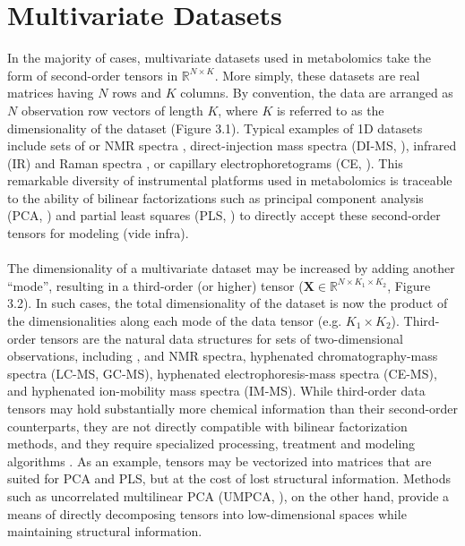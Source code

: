 \section{Multivariate Datasets}

\begin{doublespace}
In the majority of cases, multivariate datasets used in metabolomics take the
form of second-order tensors in $\mathbb{R}^{N \times K}$. More simply, these
datasets are real matrices having $N$ rows and $K$ columns. By convention,
the data are arranged as $N$ observation row vectors of length $K$, where $K$
is referred to as the dimensionality of the dataset (Figure 3.1). Typical
examples of 1D datasets include sets of \hnmr{} or \cnmr{} NMR spectra
\cite{beckonert:nprot2007,koh:colon2009}, direct-injection mass spectra
(DI-MS, \cite{castrillo:phch2003,southam:anchem2007,zhou:asms2010}), infrared
(IR) and Raman spectra \cite{ellis:analyst2006,cherney:anchem2007}, or
capillary electrophoretograms (CE, \cite{ramautar:trac2006}). This remarkable
diversity of instrumental platforms used in metabolomics is traceable to the
ability of bilinear factorizations such as principal component analysis
(PCA, \cite{jolliffe2002}) and partial least squares (PLS, \cite{wold1993}) to
directly accept these second-order tensors for modeling (vide infra).
\\\\
The dimensionality of a multivariate dataset may be increased by adding another
``mode'', resulting in a third-order (or higher) tensor
($\mathbf{X} \in \mathbb{R}^{N \times K_1 \times K_2}$, Figure 3.2). In such
cases, the total dimensionality of the dataset is now the product of the
dimensionalities along each mode of the data tensor (e.g. $K_1 \times K_2$).
Third-order tensors are the natural data structures for sets of two-dimensional
observations, including \hhnmr{}, \hcnmr{} and \hnnmr{} NMR spectra, hyphenated
chromatography-mass spectra (LC-MS, GC-MS), hyphenated electrophoresis-mass
spectra (CE-MS), and hyphenated ion-mobility mass spectra (IM-MS). While
third-order data tensors may hold substantially more chemical information than
their second-order counterparts, they are not directly compatible with bilinear
factorization methods, and they require specialized processing,
treatment and modeling algorithms \cite{lu:ieee2009,lu:pr2011}. As an example,
tensors may be vectorized into matrices \cite{hedenstrom:cils2008} that are
suited for PCA and PLS, but at the cost of lost structural information. Methods
such as uncorrelated multilinear PCA (UMPCA, \cite{lu:ieee2009}), on the other
hand, provide a means of directly decomposing tensors into low-dimensional
spaces while maintaining structural information.
\end{doublespace}

